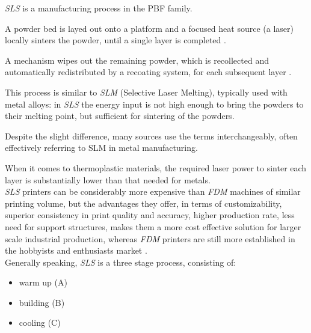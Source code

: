 \documentclass{article}
\begin{document}
    \textit{SLS} is a manufacturing process in the PBF family. 

    A powder bed is layed out onto a platform and a focused heat source (a laser) locally sinters the powder, 
    until a single layer is completed \autocites*{Recent_progress_polymers_AM}{Kovalcik_PHA_Review}. 

    A mechanism wipes out the remaining powder, which is recollected and automatically redistributed by a recoating 
    system, for each subsequent layer \autocite*{Padovano_SLS_Review}. 

    This process is similar to \textit{SLM} (Selective Laser Melting), typically used with metal alloys: in \textit{SLS} the energy input is not high enough 
    to bring the powders to their melting point, but sufficient for sintering of the powders. 

    Despite the slight difference, many sources use the terms interchangeably, often effectively referring to SLM in metal manufacturing. 
    
    When it comes to thermoplastic materials, the required laser power to sinter each layer is substantially lower than that needed for metals. \\ 

    \textit{SLS} printers can be considerably more expensive than \textit{FDM} machines of similar printing volume, but the advantages they offer, 
    in terms of customizability, superior consistency in print quality and accuracy, higher production rate, less need for support structures, 
    makes them a more cost effective solution for larger scale industrial production, whereas \textit{FDM} printers are still more established 
    in the hobbyists and enthusiasts market \autocite*{Padovano_SLS_Review}. \\ 

    Generally speaking, \textit{SLS} is a three stage process, consisting of: 
    
    \begin{itemize}
        \item warm up (A)
        \item building (B)
        \item cooling (C)
    \end{itemize}
\end{document}

